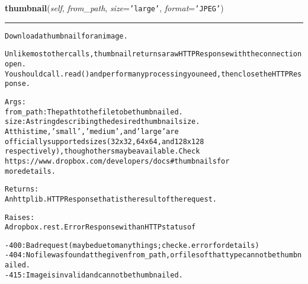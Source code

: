     \vspace{0.5ex}

\hspace{.8\funcindent}\begin{boxedminipage}{\funcwidth}

    \raggedright \textbf{thumbnail}(\textit{self}, \textit{from\_path}, \textit{size}={\tt \texttt{'}\texttt{large}\texttt{'}}, \textit{format}={\tt \texttt{'}\texttt{JPEG}\texttt{'}})

    \vspace{-1.5ex}

    \rule{\textwidth}{0.5\fboxrule}
\setlength{\parskip}{2ex}
\begin{alltt}
Download a thumbnail for an image.

Unlike most other calls, thumbnail returns a raw HTTPResponse with the connection open.
You should call .read() and perform any processing you need, then close the HTTPResponse.

Args:
    from\_path: The path to the file to be thumbnailed.
    size: A string describing the desired thumbnail size.
       At this time, 'small', 'medium', and 'large' are
       officially supported sizes (32x32, 64x64, and 128x128
       respectively), though others may be available. Check
       https://www.dropbox.com/developers/docs\#thumbnails for
       more details.

Returns:
    An httplib.HTTPResponse that is the result of the request.

Raises:
    A dropbox.rest.ErrorResponse with an HTTP status of

    - 400: Bad request (may be due to many things; check e.error for details)
    - 404: No file was found at the given from\_path, or files of that type cannot be thumbnailed.
    - 415: Image is invalid and cannot be thumbnailed.
\end{alltt}

\setlength{\parskip}{1ex}
    \end{boxedminipage}

    \label{lib:dropbox:DropboxClient:thumbnail_and_metadata}

    \vspace{0.5ex}

